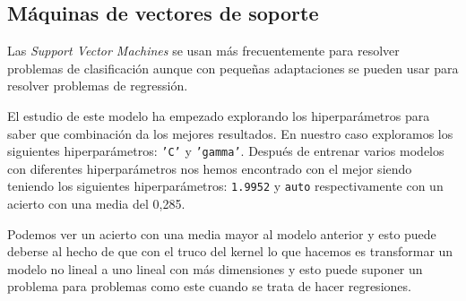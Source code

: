 \subsection{Máquinas de vectores de soporte}
Las \textit{Support Vector Machines} se usan más frecuentemente para resolver problemas de clasificación aunque con pequeñas adaptaciones se pueden usar para resolver problemas de regressión.
\newline

El estudio de este modelo ha empezado explorando los hiperparámetros para saber que combinación da los mejores resultados. En nuestro caso exploramos los siguientes hiperparámetros: \texttt{'C'} y \texttt{'gamma'}. Después de entrenar varios modelos con diferentes hiperparámetros nos hemos encontrado con el mejor siendo teniendo los siguientes hiperparámetros: \texttt{1.9952} y \texttt{auto} respectivamente con un acierto con una media del 0,285.
\newline

Podemos ver un acierto con una media mayor al modelo anterior y esto puede deberse al hecho de que con el truco del kernel lo que hacemos es transformar un modelo no lineal a uno lineal con más dimensiones y esto puede suponer un problema para problemas como este cuando se trata de hacer regresiones.
